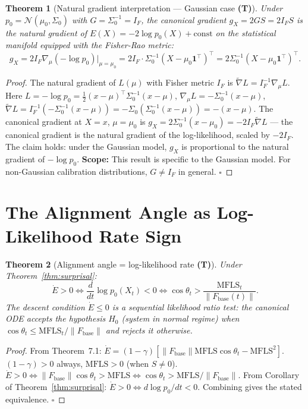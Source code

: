 \documentclass[11pt,a4paper]{article}
\newtheorem{theorem}{Theorem}[section]
\theoremstyle{definition}
\newcommand{\Fbase}{F_{\mathrm{base}}}
\newcommand{\gX}{g_X}
\begin{document}
\begin{theorem}[Natural gradient interpretation --- Gaussian case \textbf{(T)}]
\label{thm:natural_grad}
Under $p_0 = \mathcal{N}(\mu_0,\Sigma_0)$ with $G = \Sigma_0^{-1} = I_F$,
the canonical gradient $\gX = 2GS = 2I_F S$ is the natural gradient of
$E(X) = -2\log p_0(X) + \mathrm{const}$
on the statistical manifold equipped with the Fisher-Rao metric:
\[
\gX = 2I_F\nabla_\mu(-\log p_0)\big|_{\mu=\mu_0} = 2I_F\cdot\Sigma_0^{-1}(X-\mu_0\mathbf{1}^\top)^\top = 2\Sigma_0^{-1}(X-\mu_0\mathbf{1}^\top)^\top.
\]
\end{theorem}

\begin{proof}
The natural gradient of $L(\mu)$ with Fisher metric $I_F$ is
$\tilde\nabla L = I_F^{-1}\nabla_\mu L$.
Here $L = -\log p_0 = \tfrac{1}{2}(x-\mu)^\top\Sigma_0^{-1}(x-\mu)$,
$\nabla_\mu L = -\Sigma_0^{-1}(x-\mu)$,
$\tilde\nabla L = I_F^{-1}(-\Sigma_0^{-1}(x-\mu)) = -\Sigma_0(\Sigma_0^{-1}(x-\mu)) = -(x-\mu)$.
The canonical gradient at $X = x$, $\mu = \mu_0$ is
$\gX = 2\Sigma_0^{-1}(x-\mu_0) = -2I_F\tilde\nabla L$
--- the canonical gradient is the natural gradient of the log-likelihood,
scaled by $-2I_F$.
The claim holds: under the Gaussian model, $\gX$ is proportional to the
natural gradient of $-\log p_0$.
\textbf{Scope:} This result is specific to the Gaussian model.
For non-Gaussian calibration distributions, $G \neq I_F$ in general. $\square$
\end{proof}

\section{The Alignment Angle as Log-Likelihood Rate Sign}
\label{sec:alignment_probability}

\begin{theorem}[Alignment angle = log-likelihood rate \textbf{(T)}]
\label{thm:alignment_llr}
Under Theorem~\ref{thm:surprisal}:
\[
\dot E > 0 \iff \frac{d}{dt}\log p_0(X_t) < 0 \iff
\cos\theta_t > \frac{\mathrm{MFLS}_t}{\|\Fbase(t)\|}.
\]
The descent condition $\dot E \leq 0$ is a \emph{sequential likelihood ratio test}:
the canonical ODE accepts the hypothesis $H_0$ (system in normal regime)
when $\cos\theta_t \leq \mathrm{MFLS}_t/\|\Fbase\|$ and rejects it otherwise.
\end{theorem}

\begin{proof}
From Theorem~7.1: $\dot E = (1-\gamma)[\|\Fbase\|\mathrm{MFLS}\cos\theta_t - \mathrm{MFLS}^2]$.
$(1-\gamma) > 0$ always, $\mathrm{MFLS} > 0$ (when $S \neq 0$).
$\dot E > 0 \iff \|\Fbase\|\cos\theta_t > \mathrm{MFLS} \iff \cos\theta_t > \mathrm{MFLS}/\|\Fbase\|$.
From Corollary of Theorem~\ref{thm:surprisal}: $\dot E > 0 \iff d\log p_0/dt < 0$.
Combining gives the stated equivalence. $\square$
\end{proof}
\end{document}
